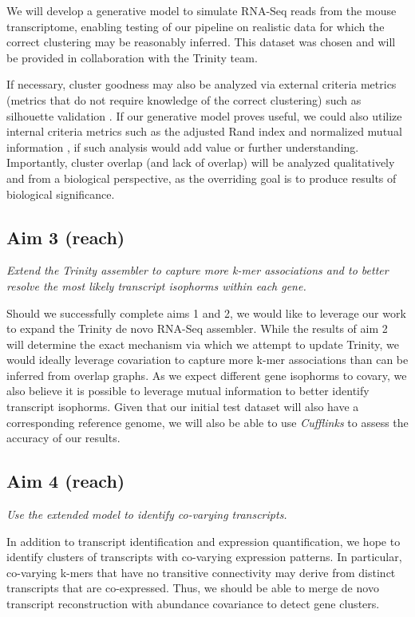 \documentclass[11pt]{article}
\begin{document}
We will develop a generative model to simulate RNA-Seq reads from the mouse transcriptome, enabling testing of our pipeline on realistic data for which the correct clustering may be reasonably inferred. This dataset was chosen and will be provided in collaboration with the Trinity team.

If necessary, cluster goodness may also be analyzed via external criteria metrics (metrics that do not require knowledge of the correct clustering) such as silhouette validation \cite{rousseeuw87}. If our generative model proves useful, we could also utilize internal criteria metrics such as the adjusted Rand index \cite{rand71} and normalized mutual information \cite{strehl02}, if such analysis would add value or further understanding. Importantly, cluster overlap (and lack of overlap) will be analyzed qualitatively and from a biological perspective, as the overriding goal is to produce results of biological significance.

\subsection{Aim 3 (reach)}
  \emph{Extend the Trinity assembler to capture more k-mer associations and to better resolve the most likely transcript isophorms within each gene.}

  \noindent Should we successfully complete aims 1 and 2, we would like to leverage our work to expand the Trinity de novo RNA-Seq assembler. While the results of aim 2 will determine the exact mechanism via which we attempt to update Trinity, we would ideally leverage covariation to capture more k-mer associations than can be inferred from overlap graphs. As we expect different gene isophorms to covary, we also believe it is possible to leverage mutual information to better identify transcript isophorms. Given that our initial test dataset will also have a corresponding reference genome, we will also be able to use \emph{Cufflinks} to assess the accuracy of our results.

\subsection{Aim 4 (reach)}
  \emph{Use the extended model to identify co-varying transcripts.}

\noindent In addition to transcript identification and expression quantification, we hope to identify clusters of transcripts with co-varying expression patterns. In particular, co-varying k-mers that have no transitive connectivity may derive from distinct transcripts that are co-expressed. Thus, we should be able to merge de novo transcript reconstruction with abundance covariance to detect gene clusters.
\end{document}
